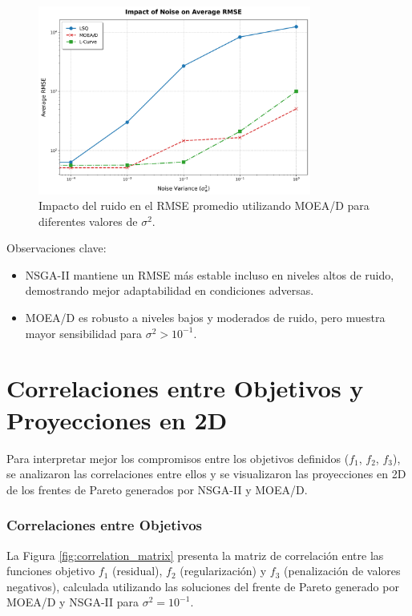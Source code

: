 \begin{figure}[H]
    \centering
    \includegraphics[width=0.8\textwidth]{Images/impact_noise_on_rmse_moead.png}
    \caption{Impacto del ruido en el RMSE promedio utilizando MOEA/D para diferentes valores de \( \sigma^2 \).}
    \label{fig:rmse_moead}
\end{figure}

Observaciones clave:
\begin{itemize}
    \item NSGA-II mantiene un RMSE más estable incluso en niveles altos de ruido, demostrando mejor adaptabilidad en condiciones adversas.
    \item MOEA/D es robusto a niveles bajos y moderados de ruido, pero muestra mayor sensibilidad para \( \sigma^2 > 10^{-1} \).
\end{itemize}


\section{Correlaciones entre Objetivos y Proyecciones en 2D} \label{sec:results:correlation}

Para interpretar mejor los compromisos entre los objetivos definidos (\(f_1\), \(f_2\), \(f_3\)), se analizaron las correlaciones entre ellos y se visualizaron las proyecciones en 2D de los frentes de Pareto generados por NSGA-II y MOEA/D.

\subsubsection{Correlaciones entre Objetivos}

La Figura \ref{fig:correlation_matrix} presenta la matriz de correlación entre las funciones objetivo \( f_1 \) (residual), \( f_2 \) (regularización) y \( f_3 \) (penalización de valores negativos), calculada utilizando las soluciones del frente de Pareto generado por MOEA/D y NSGA-II para \( \sigma^2 = 10^{-1} \).

